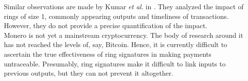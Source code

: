 Similar observations are made by Kumar {\em et al.} in \cite{DBLP:conf/esorics/KumarFTS17}.
They analyzed the impact of rings of size 1, commonly appearing outputs and timeliness of transactions. However, they
do not provide a precise quantification of the impact.
\\

Monero is not yet a mainstream cryptocurrency. The body of research around it has not reached the levels of, say, Bitcoin.
Hence, it is currently difficult to ascertain the true effectiveness of ring signatures in making payments untraceable.
Presumably, ring signatures make it difficult to link inputs to previous outputs, but they can not prevent it altogether.


